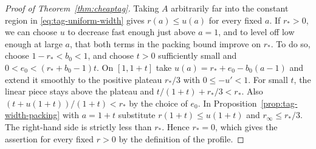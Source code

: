 \begin{proof}[Proof of Theorem~\ref{thm:cheaptag}]
Taking $A$ arbitrarily far into the constant region in
\eqref{eq:tag-uniform-width} gives $r(a)\le u(a)$ for every fixed $a$.
If $r_*>0$, we can choose $u$ to decrease fast enough just above
$a=1$, and to level off low enough at large $a$, that both terms in
the packing bound improve on $r_*$. To do so, choose $1-r_*<b_0<1$, and choose $t>0$ sufficiently
small and $0<e_0<(r_*+b_0-1)t$. On $[1,1+t]$ take
$u(a)=r_*+e_0-b_0(a-1)$ and extend it smoothly to the positive plateau
$r_*/3$ with $0\le-u'<1$. For small $t$, the linear piece stays above
the plateau and $t/(1+t)+r_*/3<r_*$. Also
$(t+u(1+t))/(1+t)<r_*$ by the choice of $e_0$. In
Proposition~\ref{prop:tag-width-packing} with $a=1+t$ substitute
$r(1+t)\le u(1+t)$ and $r_\infty\le r_*/3$. The right-hand side is
strictly less than $r_*$. Hence $r_*=0$, which gives the assertion
for every fixed $r>0$ by the definition of the profile.
\end{proof}
